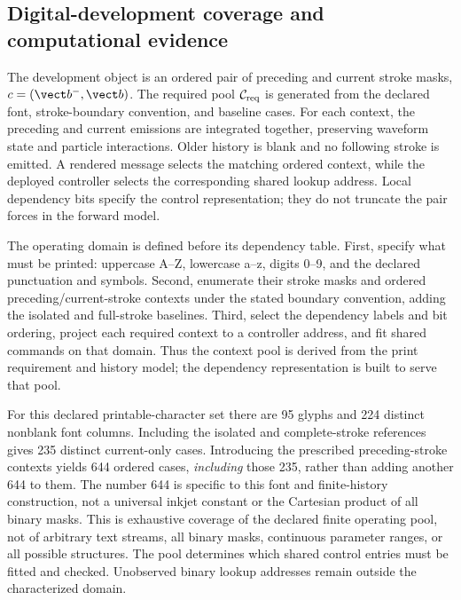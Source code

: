 \subsection{Digital-development coverage and computational evidence}\label{sec:framework_evidence}

The development object is an ordered pair of preceding and current stroke masks, $c=(\vect b^{-},\vect b)$. The required pool $\mathcal C_{\rm req}$ is generated from the declared font, stroke-boundary convention, and baseline cases. For each context, the preceding and current emissions are integrated together, preserving waveform state and particle interactions. Older history is blank and no following stroke is emitted. A rendered message selects the matching ordered context, while the deployed controller selects the corresponding shared lookup address. Local dependency bits specify the control representation; they do not truncate the pair forces in the forward model.

The operating domain is defined before its dependency table. First, specify what must be printed: uppercase A--Z, lowercase a--z, digits 0--9, and the declared punctuation and symbols. Second, enumerate their stroke masks and ordered preceding/current-stroke contexts under the stated boundary convention, adding the isolated and full-stroke baselines. Third, select the dependency labels and bit ordering, project each required context to a controller address, and fit shared commands on that domain. Thus the context pool is derived from the print requirement and history model; the dependency representation is built to serve that pool.

For this declared printable-character set there are 95 glyphs and 224 distinct nonblank font columns. Including the isolated and complete-stroke references gives 235 distinct current-only cases. Introducing the prescribed preceding-stroke contexts yields 644 ordered cases, \emph{including} those 235, rather than adding another 644 to them. The number 644 is specific to this font and finite-history construction, not a universal inkjet constant or the Cartesian product of all binary masks. This is exhaustive coverage of the declared finite operating pool, not of arbitrary text streams, all binary masks, continuous parameter ranges, or all possible structures. The pool determines which shared control entries must be fitted and checked. Unobserved binary lookup addresses remain outside the characterized domain.

